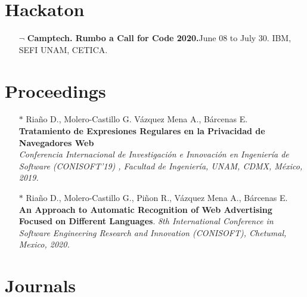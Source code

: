 \documentclass[]{friggeri-cv}
\begin{document}
\section{Hackaton}

\begin{itemize}
    \item[$¬$] \textbf{Camptech. Rumbo a Call for Code 2020.}June 08 to July 30. IBM, SEFI UNAM, CETICA. 
\end{itemize}

\section{Proceedings}
\begin{itemize}
    \item [$*$] Riaño D., Molero-Castillo G. Vázquez Mena A., Bárcenas E.\\
    \textbf{Tratamiento de Expresiones Regulares en la Privacidad de Navegadores Web}\\
    \emph{Conferencia Internacional de Investigación e Innovación en Ingeniería de Software (CONISOFT’19) , Facultad de Ingeniería, UNAM, CDMX, México, 2019.}
    
    \item [$*$] Riaño D., Molero-Castillo G., Piñon R., Vázquez Mena A., Bárcenas E.\\
    \textbf{An Approach to Automatic Recognition of Web Advertising Focused on Different Languages}.
    \emph{8th International Conference in Software Engineering Research and Innovation (CONISOFT), Chetumal, Mexico, 2020. 
    }
    \end{itemize}
\section{Journals}
\end{document}
